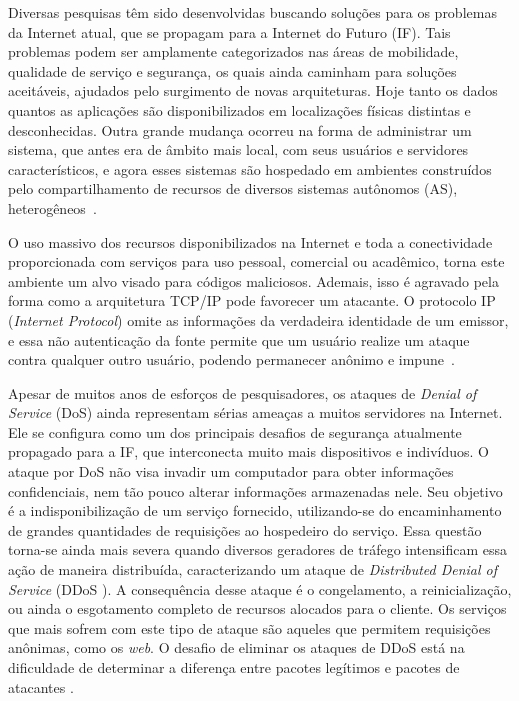 
Diversas pesquisas têm sido desenvolvidas buscando soluções para os problemas da Internet atual, que se propagam para a Internet do Futuro (IF). Tais problemas podem ser amplamente categorizados nas áreas de mobilidade, qualidade de serviço e segurança, os quais ainda caminham para soluções aceitáveis, ajudados pelo surgimento de novas arquiteturas. Hoje tanto os dados quantos as aplicações são disponibilizados em localizações físicas distintas e desconhecidas. Outra grande mudança ocorreu na forma de administrar um sistema, que antes era de âmbito mais local, com seus usuários e servidores característicos, e agora esses sistemas são hospedado em ambientes construídos pelo compartilhamento de recursos de diversos sistemas autônomos (AS), heterogêneos~\cite{5486552}.

O uso massivo dos recursos disponibilizados na Internet e toda a conectividade proporcionada com serviços para uso pessoal, comercial ou acadêmico, torna este ambiente um alvo visado para códigos maliciosos. Ademais, isso é agravado pela forma como a arquitetura TCP/IP pode favorecer um atacante. O protocolo IP (\emph{Internet Protocol}) omite as informações da verdadeira identidade de um emissor, e essa não autenticação da fonte permite que um usuário realize um ataque contra qualquer outro usuário, podendo permanecer anônimo e impune~\cite{1039856}.

Apesar de muitos anos de esforços de pesquisadores, os ataques de \emph{Denial of Service} (DoS) ainda representam sérias ameaças a muitos servidores na Internet.  Ele se configura como um dos principais desafios de segurança atualmente propagado para a IF, que interconecta muito mais dispositivos e indivíduos. O ataque por DoS não visa invadir um computador para obter informações confidenciais, nem tão pouco alterar informações armazenadas nele. Seu objetivo é a indisponibilização de um serviço fornecido, utilizando-se do encaminhamento de grandes quantidades de requisições ao hospedeiro do serviço. Essa questão torna-se ainda mais severa quando diversos geradores de tráfego intensificam essa ação de maneira distribuída, caracterizando um ataque de \emph{Distributed Denial of Service} (DDoS \cite{Sachdeva08ddosincidents}). A consequência desse ataque é o congelamento, a reinicialização, ou ainda o esgotamento completo de recursos alocados para o cliente. Os serviços que mais sofrem com este tipo de ataque são aqueles que permitem requisições anônimas, como os \textit{web}. O desafio de eliminar os ataques de DDoS está na dificuldade de determinar a diferença entre pacotes legítimos e pacotes de atacantes \cite{Li:2009:DDA:1683304.1684620}.

